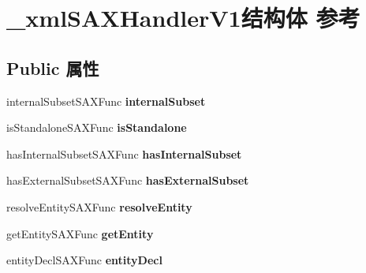 \hypertarget{struct__xml_s_a_x_handler_v1}{}\section{\+\_\+xml\+S\+A\+X\+Handler\+V1结构体 参考}
\label{struct__xml_s_a_x_handler_v1}
\subsection*{Public 属性}
\begin{DoxyCompactItemize}
\item 
\mbox{\label{struct__xml_s_a_x_handler_v1_a42f4e20c793c236300b6101d49212580}} 
internal\+Subset\+S\+A\+X\+Func {\bfseries internal\+Subset}
\item 
\mbox{\label{struct__xml_s_a_x_handler_v1_a4b9bd1931ab440bd5b7d9df8009440bc}} 
is\+Standalone\+S\+A\+X\+Func {\bfseries is\+Standalone}
\item 
\mbox{\label{struct__xml_s_a_x_handler_v1_afe7c41e644a1152afd4bc13fe56a60de}} 
has\+Internal\+Subset\+S\+A\+X\+Func {\bfseries has\+Internal\+Subset}
\item 
\mbox{\label{struct__xml_s_a_x_handler_v1_a0ca8a76baf0d76b04d914ad9a56c4506}} 
has\+External\+Subset\+S\+A\+X\+Func {\bfseries has\+External\+Subset}
\item 
\mbox{\label{struct__xml_s_a_x_handler_v1_a949a9307787020339ed0d46376a676ea}} 
resolve\+Entity\+S\+A\+X\+Func {\bfseries resolve\+Entity}
\item 
\mbox{\label{struct__xml_s_a_x_handler_v1_a6d00cd90884aff134c70cfed77798cdb}} 
get\+Entity\+S\+A\+X\+Func {\bfseries get\+Entity}
\item 
\mbox{\label{struct__xml_s_a_x_handler_v1_ab8767df981b572d1a4bb72de4eece794}} 
entity\+Decl\+S\+A\+X\+Func {\bfseries entity\+Decl}
\item 
\mbox{\label{struct__xml_s_a_x_handler_v1_a46b3e77687757223f11de89d19290e78}} 

\end{DoxyCompactItemize}
